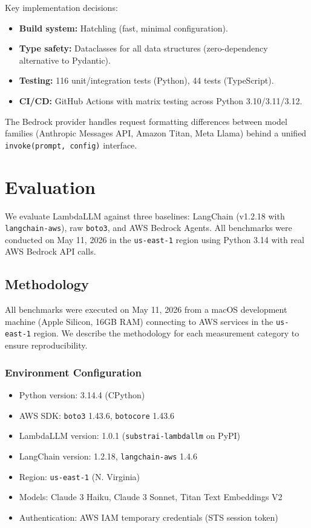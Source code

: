 \documentclass[10pt,twocolumn,letterpaper]{article}
\begin{document}
Key implementation decisions:

\begin{itemize}[leftmargin=*,itemsep=2pt,topsep=2pt]
    \item \textbf{Build system:} Hatchling (fast, minimal configuration).
    \item \textbf{Type safety:} Dataclasses for all data structures (zero-dependency alternative to Pydantic).
    \item \textbf{Testing:} 116 unit/integration tests (Python), 44 tests (TypeScript).
    \item \textbf{CI/CD:} GitHub Actions with matrix testing across Python 3.10/3.11/3.12.
\end{itemize}

The Bedrock provider handles request formatting differences between model families (Anthropic Messages API, Amazon Titan, Meta Llama) behind a unified \texttt{invoke(prompt, config)} interface.

\section{Evaluation}

We evaluate LambdaLLM against three baselines: LangChain (v1.2.18 with \texttt{langchain-aws}), raw \texttt{boto3}, and AWS Bedrock Agents. All benchmarks were conducted on May 11, 2026 in the \texttt{us-east-1} region using Python 3.14 with real AWS Bedrock API calls.

\subsection{Methodology}

All benchmarks were executed on May 11, 2026 from a macOS development machine (Apple Silicon, 16GB RAM) connecting to AWS services in the \texttt{us-east-1} region. We describe the methodology for each measurement category to ensure reproducibility.

\subsubsection{Environment Configuration}

\begin{itemize}[leftmargin=*,itemsep=1pt,topsep=2pt]
    \item Python version: 3.14.4 (CPython)
    \item AWS SDK: \texttt{boto3} 1.43.6, \texttt{botocore} 1.43.6
    \item LambdaLLM version: 1.0.1 (\texttt{substrai-lambdallm} on PyPI)
    \item LangChain version: 1.2.18, \texttt{langchain-aws} 1.4.6
    \item Region: \texttt{us-east-1} (N. Virginia)
    \item Models: Claude 3 Haiku, Claude 3 Sonnet, Titan Text Embeddings V2
    \item Authentication: AWS IAM temporary credentials (STS session token)
\end{itemize}
\end{document}
